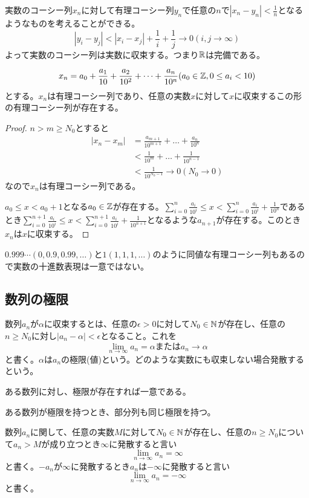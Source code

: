 		実数のコーシー列${x_n}$に対して有理コーシー列${y_n}$で任意の$n$で$|x_n - y_n| < \frac{1}{n}$となるようなものを考えることができる。
			\[|y_i - y_j| < |x_i - x_j| + \frac{1}{i} + \frac{1}{j} \to 0 (i, j \to \infty)\]
		よって実数のコーシー列は実数に収束する。つまり$\mathbb{R}$は完備である。

		\begin{thm}[実数の十進数表示]
				\[x_n = a_0 + \frac{a_1}{10} + \frac{a_2}{10^2} + \dots + \frac{a_n}{10^n} (a_0 \in \mathbb{Z}, 0 \leq a_i < 10)\]
			とする。${x_n}$は有理コーシー列であり、任意の実数$x$に対して$x$に収束するこの形の有理コーシー列が存在する。
		\end{thm}
		\begin{proof}
			$n > m \geq N_0$とすると
			\begin{align*}
				|x_n - x_m|
				&= \frac{a_{m+1}}{10^{m+1}} + \dots + \frac{a_n}{10^n}\\
				&< \frac{1}{10^m} + \dots + \frac{1}{10^{n-1}}\\
				&< \frac{1}{10^{N_0-1}} \to 0(N_0 \to 0)
			\end{align*}
			なので${x_n}$は有理コーシー列である。

			$a_0 \leq x < a_0 + 1$となる$a_0 \in \mathbb{Z}$が存在する。$\sum_{i=0}^n \frac{a_i}{10^i} \leq x < \sum_{i=0}^n \frac{a_i}{10^i} + \frac{1}{10^n}$であるとき$\sum_{i=0}^{n+1} \frac{a_i}{10^i} \leq x < \sum_{i=0}^{n+1} \frac{a_i}{10^i} + \frac{1}{10^{n+1}}$となるような$a_{n+1}$が存在する。このとき${x_n}$は$x$に収束する。
		\end{proof}
		$0.999\cdots(0, 0.9, 0.99, \ldots)$と$1(1, 1, 1, \ldots)$のように同値な有理コーシー列もあるので実数の十進数表現は一意ではない。

\subsection{数列の極限}
	\begin{dfn}[極限,$\epsilon-N$論法]
		数列${a_n}$が$\alpha$に収束するとは、任意の$\epsilon > 0$に対して$N_0 \in \mathbb{N}$が存在し、任意の$n \geq N_0$に対し$|a_n - \alpha| < \epsilon$となること。これを
			\[\lim_{n \to \infty} a_n = \alpha または a_n \to \alpha\]
		と書く。$\alpha$は${a_n}$の極限(値)という。どのような実数にも収束しない場合発散するという。
	\end{dfn}
	\begin{prop}[極限の一意性]
		ある数列に対し、極限が存在すれば一意である。
	\end{prop}
	\begin{prop}
		ある数列が極限を持つとき、部分列も同じ極限を持つ。
	\end{prop}
	\begin{dfn}
		数列${a_n}$に関して、任意の実数$M$に対して$N_0 \in \mathbb{N}$が存在し、任意の$n \geq N_0$について$a_n > M$が成り立つとき$\infty$に発散すると言い
			\[\lim_{n \to \infty} a_n = \infty\]
		と書く。${-a_n}$が$\infty$に発散するとき${a_n}$は$-\infty$に発散すると言い
			\[\lim_{n \to \infty} a_n = -\infty\]
		と書く。
	\end{dfn}

